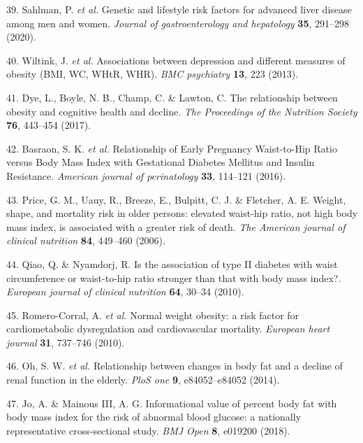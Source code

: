 \documentclass[11pt,twoside]{bristolthesis}
\begin{document}
\leavevmode\hypertarget{ref-Sahlman2020}{}%
39. Sahlman, P. \emph{et al.} Genetic and lifestyle risk factors for advanced liver disease among men and women. \emph{Journal of gastroenterology and hepatology} \textbf{35}, 291--298 (2020).

\leavevmode\hypertarget{ref-Wiltink2013}{}%
40. Wiltink, J. \emph{et al.} Associations between depression and different measures of obesity (BMI, WC, WHtR, WHR). \emph{BMC psychiatry} \textbf{13}, 223 (2013).

\leavevmode\hypertarget{ref-Dye2017}{}%
41. Dye, L., Boyle, N. B., Champ, C. \& Lawton, C. The relationship between obesity and cognitive health and decline. \emph{The Proceedings of the Nutrition Society} \textbf{76}, 443--454 (2017).

\leavevmode\hypertarget{ref-Basraon2016}{}%
42. Basraon, S. K. \emph{et al.} Relationship of Early Pregnancy Waist-to-Hip Ratio versus Body Mass Index with Gestational Diabetes Mellitus and Insulin Resistance. \emph{American journal of perinatology} \textbf{33}, 114--121 (2016).

\leavevmode\hypertarget{ref-Price2006a}{}%
43. Price, G. M., Uauy, R., Breeze, E., Bulpitt, C. J. \& Fletcher, A. E. Weight, shape, and mortality risk in older persons: elevated waist-hip ratio, not high body mass index, is associated with a greater risk of death. \emph{The American journal of clinical nutrition} \textbf{84}, 449--460 (2006).

\leavevmode\hypertarget{ref-Qiao2010}{}%
44. Qiao, Q. \& Nyamdorj, R. Is the association of type II diabetes with waist circumference or waist-to-hip ratio stronger than that with body mass index?. \emph{European journal of clinical nutrition} \textbf{64}, 30--34 (2010).

\leavevmode\hypertarget{ref-Romero-Corral2010}{}%
45. Romero-Corral, A. \emph{et al.} Normal weight obesity: a risk factor for cardiometabolic dysregulation and cardiovascular mortality. \emph{European heart journal} \textbf{31}, 737--746 (2010).

\leavevmode\hypertarget{ref-Oh2014}{}%
46. Oh, S. W. \emph{et al.} Relationship between changes in body fat and a decline of renal function in the elderly. \emph{PloS one} \textbf{9}, e84052--e84052 (2014).

\leavevmode\hypertarget{ref-Jo2018}{}%
47. Jo, A. \& Mainous III, A. G. Informational value of percent body fat with body mass index for the risk of abnormal blood glucose: a nationally representative cross-sectional study. \emph{BMJ Open} \textbf{8}, e019200 (2018).
\end{document}
